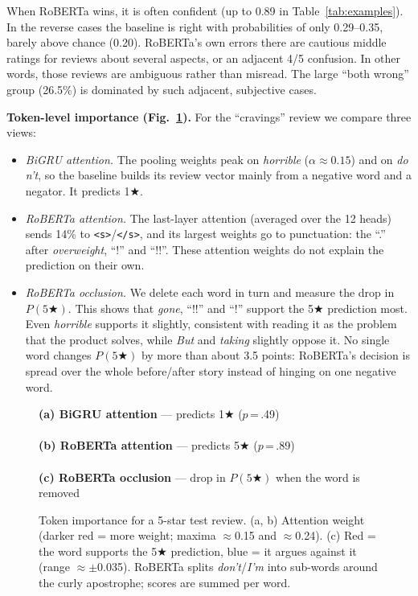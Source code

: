 \documentclass[11pt,a4paper]{article}
\newcommand{\st}{\ensuremath{{\scriptstyle\bigstar}}}
\begin{document}
When RoBERTa wins, it is often confident (up to 0.89 in Table~\ref{tab:examples}). In the reverse cases the baseline is right with probabilities of only 0.29--0.35, barely above chance (0.20). RoBERTa's own errors there are cautious middle ratings for reviews about several aspects, or an adjacent 4/5 confusion. In other words, those reviews are ambiguous rather than misread. The large ``both wrong'' group (26.5\%) is dominated by such adjacent, subjective cases.

\textbf{Token-level importance (Fig.~\ref{fig:explain}).} For the ``cravings'' review we compare three views:
\begin{itemize}
\item \textit{BiGRU attention.} The pooling weights peak on \textit{horrible} ($\alpha\approx0.15$) and on \textit{do n't}, so the baseline builds its review vector mainly from a negative word and a negator. It predicts 1\st{}.
\item \textit{RoBERTa attention.} The last-layer attention (averaged over the 12 heads) sends 14\% to \texttt{<s>}/\texttt{</s>}, and its largest weights go to punctuation: the ``.'' after \textit{overweight}, ``!'' and ``!!''. These attention weights do not explain the prediction on their own.
\item \textit{RoBERTa occlusion.} We delete each word in turn and measure the drop in $P(5\st)$. This shows that \textit{gone}, ``!!'' and ``!'' support the 5\st{} prediction most. Even \textit{horrible} supports it slightly, consistent with reading it as the problem that the product solves, while \textit{But} and \textit{taking} slightly oppose it. No single word changes $P(5\st)$ by more than about 3.5 points: RoBERTa's decision is spread over the whole before/after story instead of hinging on one negative word.
\end{itemize}

\begin{figure}[htbp]
\small\setlength{\fboxsep}{1.2pt}\raggedright
\textbf{(a) BiGRU attention} --- predicts 1\st{} ($p$\,=\,.49)\\[1pt]
\exbigruattention\\[5pt]
\textbf{(b) RoBERTa attention} --- predicts 5\st{} ($p$\,=\,.89)\\[1pt]
\exrobertaattention\\[5pt]
\textbf{(c) RoBERTa occlusion} --- drop in $P(5\st)$ when the word is removed\\[1pt]
\exrobertaocclusion
\caption{Token importance for a 5-star test review. (a, b) Attention weight (darker red = more weight; maxima $\approx$0.15 and $\approx$0.24). (c) Red = the word supports the 5\st{} prediction, blue = it argues against it (range $\approx\pm$0.035). RoBERTa splits \textit{don't}/\textit{I'm} into sub-words around the curly apostrophe; scores are summed per word.}
\label{fig:explain}
\end{figure}
\end{document}
